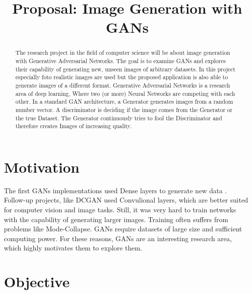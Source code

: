 \documentclass[conference,onecolumn,compsoc]{IEEEtran}
\begin{document}
\title{Proposal: Image Generation with GANs}

\author{
}
\maketitle

\begin{abstract}

\noindent
The research project in the field of computer science will be about image generation with Generative Adversarial Networks. The goal is to examine GANs and explores their capability of generating new, unseen images of arbitrary datasets. In this project especially foto realistic images are used but the proposed application is also able to generate images of a different format. Generative Adversarial Networks is a research area of deep learning, Where two (or more) Neural Networks are competing with each other. In a standard GAN architecture, a Generator generates images from a random number vector. A discriminator is deciding if the image comes from the Generator or the true Dataset. The Generator continuously tries to fool the Discriminator and therefore creates Images of increasing quality.

\end{abstract}


\section{Motivation}

\noindent
The first GANs implementations used Dense layers to generate new data \cite{goodfellow2014generative}. Follow-up projects, like DCGAN \cite{radford2016unsupervised} used Convulional layers, which are better suited for computer vision and image tasks. Still, it was very hard to train networks with the capability of generating larger images. Training often suffers from problems like Mode-Collapse. GANs require datasets of large size and sufficient computing power. For these reasons, GANs are an interesting research area, which highly motivates them to explore them.

\section{Objective}
\end{document}

